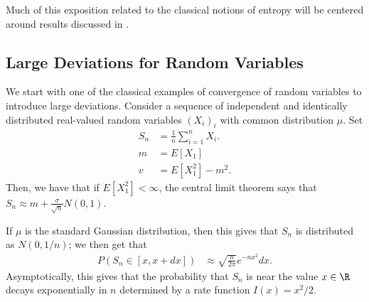\documentclass[10pt]{mypackage}
\begin{document}
Much of this exposition related to the classical notions of entropy will be centered around results discussed in \cite[Ch.\,7]{mingo_and_speicher}.
\subsection{Large Deviations for Random Variables}%
We start with one of the classical examples of convergence of random variables to introduce large deviations. Consider a sequence of independent and identically distributed real-valued random variables $\left( X_i \right)_i$ with common distribution $\mu$. Set
\begin{align*}
  S_n &= \frac{1}{n}\sum_{i=1}^{n}X_i.\\
  m &= E\left[ X_1 \right]\\
  v &= E\left[ X_1^2 \right] - m^2.
\end{align*}
Then, we have that if $E\left[ X_1^2 \right] < \infty$, the central limit theorem says that $S_n \approx m + \frac{\sigma}{\sqrt{n}}N\left( 0,1 \right)$.

If $\mu$ is the standard Gaussian distribution, then this gives that $S_n$ is distributed as $N\left( 0,1/n \right)$; we then get that
\begin{align*}
  P\left( S_n\in [x,x+dx] \right) &\approx \sqrt{\frac{n}{2\pi}}e^{-nx^2}dx.
\end{align*}
Asymptotically, this gives that the probability that $S_n$ is near the value $x\in \R$ decays exponentially in $n$ determined by a rate function $I(x) = x^2/2$.
\end{document}
